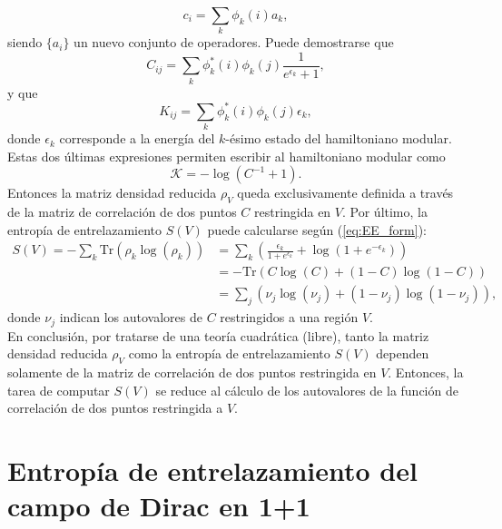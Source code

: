 \begin{equation}
c_i=\sum_k \phi_k(i)a_k,
\end{equation}
siendo $\lbrace a_i \rbrace$ un nuevo conjunto de operadores. Puede demostrarse que
\begin{equation}
C_{ij}  =\sum_k \phi^{*}_k(i)\phi_k(j)\frac{1}{e^{ \epsilon_k}+1},
\label{eq:cor_pes}
\end{equation}
y que 
\begin{equation}
K_{ij}=\sum_k \phi^{*}_k(i)\phi_k(j)\epsilon_k,
\end{equation}
donde $\epsilon_k$ corresponde a la energía del $k$-ésimo estado del hamiltoniano modular. Estas dos últimas expresiones permiten escribir al hamiltoniano modular como
\begin{equation}
\mathcal{K}=-\log(C^{-1}+1).
\end{equation}
Entonces la matriz densidad reducida $\rho_V$ queda exclusivamente definida a través de la matriz de correlación de dos puntos $C$ restringida en $V$. Por último, la entropía de entrelazamiento $S(V)$ puede calcularse según (\ref{eq:EE_form}):
\begin{equation}
\begin{split}
S(V)=-\sum_k \text{Tr}(\rho_k \log(\rho_k)) & =\sum_k \left(\frac{\epsilon_k}{1+e^{ \epsilon_k}}+\log(1+e^{- \epsilon_k})\right) \\
& = -\text{Tr}\left(C\log(C)+(1-C)\log(1-C)\right)
 \\
& = \sum_j \left(\nu_j \log(\nu_j)+(1-\nu_j)\log(1-\nu_j) \right),
\end{split}
\label{eq:EE_matC}
\end{equation}
donde $\nu_j$ indican los autovalores de $C$ restringidos a una región $V$.\\

En conclusión, por tratarse de una teoría cuadrática (libre), tanto la matriz densidad reducida $\rho_V$ como la entropía de entrelazamiento $S(V)$ dependen solamente de la matriz de correlación de dos puntos restringida en $V$. Entonces, la tarea de computar $S(V)$ se reduce al cálculo de los autovalores de la función de correlación de dos puntos restringida a $V$.
\section{Entropía de entrelazamiento del campo de Dirac en 1+1}


